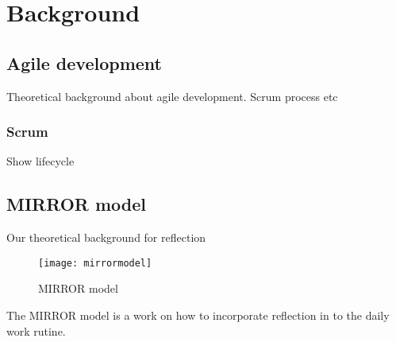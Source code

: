 \chapter{Background}

\section{Agile development}
Theoretical background about agile development. Scrum process etc

\subsection{Scrum}
Show lifecycle

\section{MIRROR model}
Our theoretical background for reflection
\begin{figure}[h!]
\label{logo}
\centering
	\texttt{[image: mirrormodel]}
\caption{MIRROR model}
\end{figure}
The MIRROR model is a work on how to incorporate reflection in to the daily work rutine.
